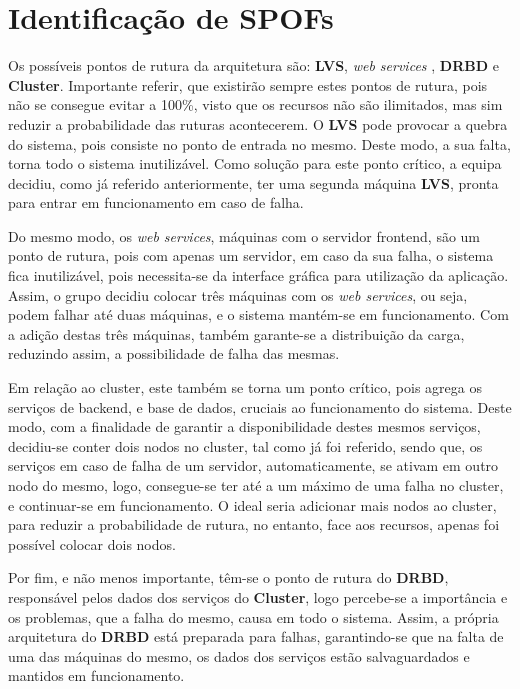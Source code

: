 \section{Identificação de SPOFs} \label{sec:idenSPOF}

\hspace{5mm} Os possíveis pontos de rutura da arquitetura são: \textbf{LVS}, \emph{web services} , \textbf{DRBD} e \textbf{Cluster}. Importante referir, que existirão sempre estes pontos de rutura, pois não se consegue evitar a 100\%, visto que os recursos não são ilimitados, mas sim reduzir a probabilidade das ruturas acontecerem. O \textbf{LVS} pode provocar a quebra do sistema, pois consiste no ponto de entrada no mesmo. Deste modo, a sua falta, torna todo o sistema inutilizável. Como solução para este ponto crítico, a equipa decidiu, como já referido anteriormente, ter uma segunda máquina \textbf{LVS}, pronta para entrar em funcionamento em caso de falha.

\hspace{5mm} Do mesmo modo, os \emph{web services}, máquinas com o servidor frontend, são um ponto de rutura, pois com apenas um servidor, em caso da sua falha, o sistema fica inutilizável, pois necessita-se da interface gráfica para utilização da aplicação. Assim, o grupo decidiu colocar três máquinas com os \emph{web services}, ou seja, podem falhar até duas máquinas, e o sistema mantém-se em funcionamento. Com a adição destas três máquinas, também garante-se a distribuição da carga, reduzindo assim, a possibilidade de falha das mesmas.

\hspace{5mm} Em relação ao cluster, este também se torna um ponto crítico, pois agrega os serviços de backend, e base de dados, cruciais ao funcionamento do sistema. Deste modo, com a finalidade de garantir a disponibilidade destes mesmos serviços, decidiu-se conter dois nodos no cluster, tal como já foi referido, sendo que, os serviços em caso de falha de um servidor, automaticamente, se ativam em outro nodo do mesmo, logo, consegue-se ter até a um máximo de uma falha no cluster, e continuar-se em funcionamento. O ideal seria adicionar mais nodos ao cluster, para reduzir a probabilidade de rutura, no entanto, face aos recursos, apenas foi possível colocar dois nodos.

\hspace{5mm} Por fim, e não menos importante, têm-se o ponto de rutura do \textbf{DRBD}, responsável pelos dados dos serviços do \textbf{Cluster}, logo percebe-se a importância e os problemas, que a falha do mesmo, causa em todo o sistema. Assim, a própria arquitetura do \textbf{DRBD} está preparada para falhas, garantindo-se que na falta de uma das máquinas do mesmo, os dados dos serviços estão salvaguardados e mantidos em funcionamento.

